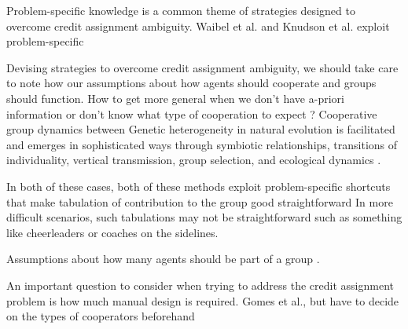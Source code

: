 Problem-specific knowledge is a common theme of strategies designed to overcome credit assignment ambiguity.
Waibel et al. and Knudson et al. exploit problem-specific


Devising strategies to overcome credit assignment ambiguity, we should take care to note how our assumptions about how agents should cooperate and groups should function.
How to get more general when we don't have a-priori information or don't know what type of cooperation to expect \cite{kernbach2008symbiotic,baele2009open}?
Cooperative group dynamics between Genetic heterogeneity in natural evolution is facilitated and emerges in sophisticated ways through symbiotic relationships, transitions of individuality, vertical transmission, group selection, and ecological dynamics \cite{vostinar2017suicide}.


In both of these cases, both of these methods exploit problem-specific shortcuts that make tabulation of contribution to the group good straightforward
In more difficult scenarios, such tabulations may not be straightforward such as something like cheerleaders or coaches on the sidelines.

Assumptions about how many agents should be part of a group .

An important question to consider when trying to address the credit assignment problem is how much manual design is required.
Gomes et al., but have to decide on the types of cooperators beforehand
